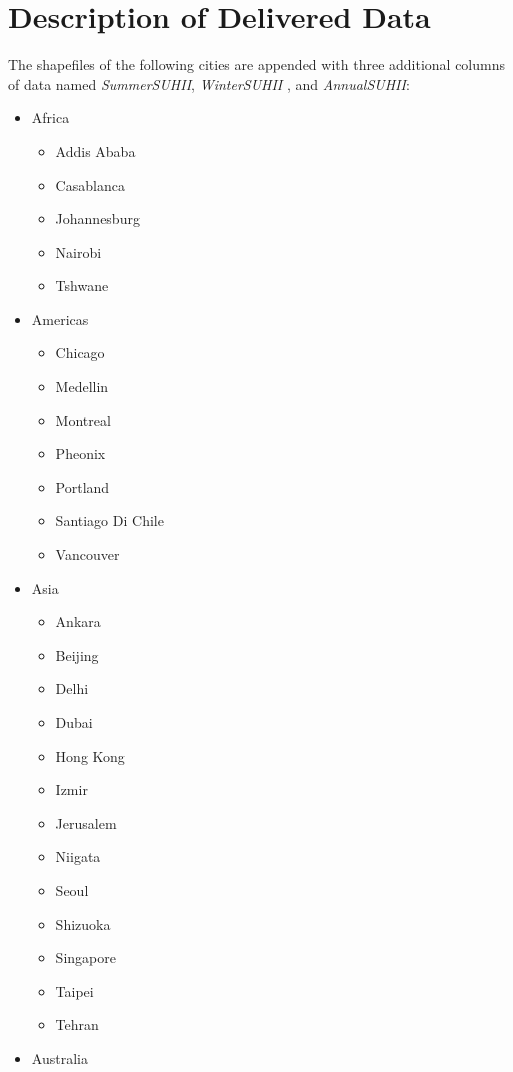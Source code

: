\documentclass{article}
\begin{document}
\section{Description of Delivered Data}
The shapefiles of the following cities are appended with three additional columns of data named \textit{SummerSUHII}, \textit{WinterSUHII} , and \textit{AnnualSUHII}:
\begin{itemize}
    \item Africa
    \begin{itemize}
        \item Addis Ababa
        \item Casablanca
        \item Johannesburg
        \item Nairobi
        \item Tshwane
    \end{itemize}
    \item Americas
    \begin{itemize}
        \item Chicago
        \item Medellin
        \item Montreal
        \item Pheonix
        \item Portland
        \item Santiago Di Chile
        \item Vancouver
    \end{itemize}
    \item Asia
    \begin{itemize}
        \item Ankara
        \item Beijing
        \item Delhi
        \item Dubai
        \item Hong Kong
        \item Izmir
        \item Jerusalem
        \item Niigata
        \item Seoul
        \item Shizuoka
        \item Singapore
        \item Taipei
        \item Tehran
    \end{itemize}
    \item Australia
    \begin{itemize}

\end{itemize}
\end{itemize}
\end{document}

